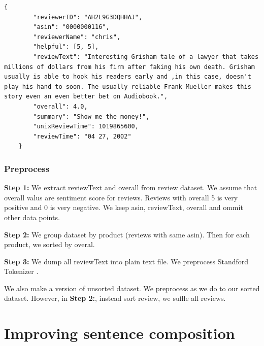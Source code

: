 \begin{lstlisting}[caption={Amazon reviews sample},label={lst:amzreview}]
	{
		"reviewerID": "AH2L9G3DQHHAJ",
		"asin": "0000000116",
		"reviewerName": "chris",
		"helpful": [5, 5],
		"reviewText": "Interesting Grisham tale of a lawyer that takes millions of dollars from his firm after faking his own death. Grisham usually is able to hook his readers early and ,in this case, doesn't play his hand to soon. The usually reliable Frank Mueller makes this story even an even better bet on Audiobook.",
		"overall": 4.0,
		"summary": "Show me the money!",
		"unixReviewTime": 1019865600,
		"reviewTime": "04 27, 2002"
	}
\end{lstlisting}

\subsubsection{Preprocess}
\textbf{Step 1:}
We extract reviewText and overall from review dataset. We assume that overall valus are sentiment score for reviews. Reviews with overall 5 is very positive and 0 is very negative. We keep asin, reviewText, overall and ommit other data points.

\textbf{Step 2:}
We group dataset by product (reviews with same asin). Then for each product, we sorted by overal.

\textbf{Step 3:}
We dump all reviewText into plain text file. We preprocess Standford Tokenizer \cite{tokenizerpart}.

We also make a version of unsorted dataset. We preprocess as we do to our sorted dataset. However, in \textbf{Step 2:}, instead sort review, we suffle all reviews.

\section{Improving sentence composition}



